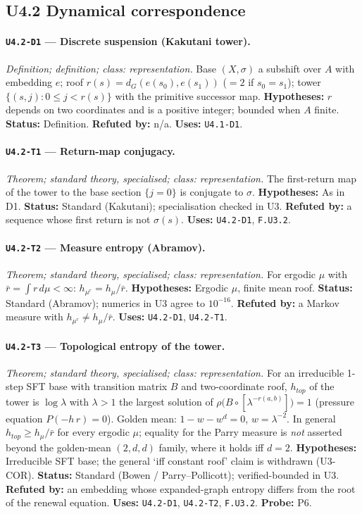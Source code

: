 \documentclass[11pt]{article}
\begin{document}
\subsection{U4.2 Dynamical correspondence}
\paragraph{\texttt{U4.2-D1} --- Discrete suspension (Kakutani tower).} \emph{Definition; definition; class: representation.} Base $(X,\sigma)$ a subshift over $A$ with embedding $e$; roof $r(s)=d_G(e(s_0),e(s_1))$ ($=2$ if $s_0=s_1$); tower $\{(s,j):0\le j<r(s)\}$ with the primitive successor map. \textbf{Hypotheses:} $r$ depends on two coordinates and is a positive integer; bounded when $A$ finite. \textbf{Status:} Definition. \textbf{Refuted by:} n/a. \textbf{Uses:} \texttt{U4.1-D1}.

\paragraph{\texttt{U4.2-T1} --- Return-map conjugacy.} \emph{Theorem; standard theory, specialised; class: representation.} The first-return map of the tower to the base section $\{j=0\}$ is conjugate to $\sigma$. \textbf{Hypotheses:} As in D1. \textbf{Status:} Standard (Kakutani); specialisation checked in U3. \textbf{Refuted by:} a sequence whose first return is not $\sigma(s)$. \textbf{Uses:} \texttt{U4.2-D1}, \texttt{F.U3.2}.

\paragraph{\texttt{U4.2-T2} --- Measure entropy (Abramov).} \emph{Theorem; standard theory, specialised; class: representation.} For ergodic $\mu$ with $\bar r=\int r\,d\mu<\infty$: $h_{\mu^r}=h_\mu/\bar r$. \textbf{Hypotheses:} Ergodic $\mu$, finite mean roof. \textbf{Status:} Standard (Abramov); numerics in U3 agree to $10^{-16}$. \textbf{Refuted by:} a Markov measure with $h_{\mu^r}\ne h_\mu/\bar r$. \textbf{Uses:} \texttt{U4.2-D1}, \texttt{U4.2-T1}.

\paragraph{\texttt{U4.2-T3} --- Topological entropy of the tower.} \emph{Theorem; standard theory, specialised; class: representation.} For an irreducible 1-step SFT base with transition matrix $B$ and two-coordinate roof, $h_{top}$ of the tower is $\log\lambda$ with $\lambda>1$ the largest solution of $\rho\big(B\circ[\lambda^{-r(a,b)}]\big)=1$ (pressure equation $P(-h\,r)=0$). Golden mean: $1-w-w^{d}=0$, $w=\lambda^{-2}$. In general $h_{top}\ge h_\mu/\bar r$ for every ergodic $\mu$; equality for the Parry measure is \emph{not} asserted beyond the golden-mean $(2,d,d)$ family, where it holds iff $d=2$. \textbf{Hypotheses:} Irreducible SFT base; the general `iff constant roof' claim is withdrawn (U3-COR). \textbf{Status:} Standard (Bowen / Parry--Pollicott); verified-bounded in U3. \textbf{Refuted by:} an embedding whose expanded-graph entropy differs from the root of the renewal equation. \textbf{Uses:} \texttt{U4.2-D1}, \texttt{U4.2-T2}, \texttt{F.U3.2}. \textbf{Probe:} P6.
\end{document}
